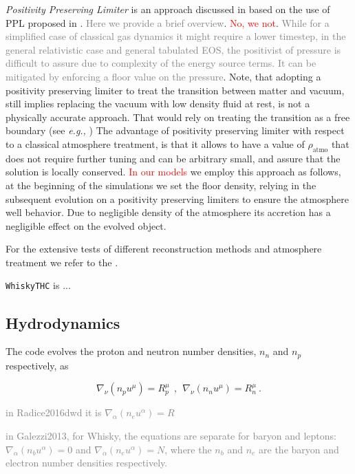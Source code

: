 \documentclass[11pt,a4paper,headinclude=true,DIV=14,BCOR=8mm,chapterprefix,listof=totoc,twoside,openright,abstracton]{scrbook}
\newcommand{\red}[1]{\textcolor{red}{#1}}
\newcommand{\gray}[1]{\textcolor{gray}{#1}}
\begin{document}
\textit{Positivity Preserving Limiter} is an approach discussed in \cite{Radice:2013apa} based on the use of PPL proposed in \cite{Hu:2013}. \gray{Here we provide a brief overview}. \red{No, we not}.
\gray{While for a simplified case of classical gas dynamics it might require a lower timestep, in the general relativistic case and general tabulated EOS, the positivist of pressure is difficult to assure due to complexity of the energy source terms. It can be mitigated by enforcing a floor value on the pressure}. 
Note, that adopting a positivity preserving limiter to treat the transition between matter and vacuum, still implies replacing the vacuum with low density fluid at rest, is not a physically accurate approach. That would rely on treating the transition as a free boundary (see \textit{e.g.,} \cite{Kastaun:2006}) The advantage of positivity preserving limiter with respect to a classical atmosphere treatment, is that it allows to have a value of $\rho_{\text{atmo}}$ that does not require further tuning and can be arbitrary small, and assure that the solution is locally conserved. 
\textcolor{red}{In our models} we employ this approach as follows, at the beginning of the simulations we set the floor density, relying in the subsequent evolution on a positivity preserving limiters to ensure the atmosphere well behavior. Due to negligible density of the atmosphere its accretion has a negligible effect on the evolved object. 

For the extensive tests of different reconstruction methods and atmosphere treatment we refer to the \cite{Radice:2013apa}.



\texttt{WhiskyTHC} is ...
\cite{Radice:2012cu,Radice:2013xpa,Radice:2013hxh,Radice:2015nva}


\subsection{Hydrodynamics}

The code evolves the proton and neutron number densities, $n_n$ and $n_p$
respectively, as 

\begin{equation}
\label{eq:wthc:pndens}
\nabla_\nu (n_p u^\mu) = R_p^\mu \ \ , \ \ 
\nabla_\nu (n_n u^\mu) = R_n^\mu \ .
\end{equation}

\gray{in Radice2016dwd it is $\nabla_{\alpha}(n_e u^{\alpha}) = R$}

\gray{in Galezzi2013, for Whisky, the equations are separate for baryon and leptons: $\nabla_{\alpha}(n_bu^{\alpha})=0$ and $\nabla_{\alpha}(n_eu^{\alpha})=N$, where the $n_b$ and $n_e$ are the baryon and electron number densities respectively.}
\end{document}
